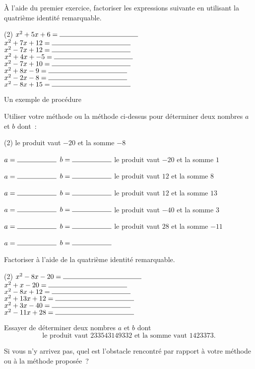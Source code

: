 \documentclass[a4paper,12pt]{report}
\begin{document}
\begin{exo}
	À l'aide du premier exercice, factoriser les expressions suivante en utilisant la quatrième identité remarquable.
\begin{tasks}(2)
\task $x^2+5x+6=\ligne{4}$ 
\task $x^2+7x+12=\ligne{4}$
\task $x^2-7x+12=\ligne{4}$
\task $x^2+4x+-5=\ligne{4}$
\task $x^2-7x+10=\ligne{4}$
\task $x^2+8x-9=\ligne{4}$
\task $x^2-2x-8=\ligne{4}$
\task $x^2-8x+15=\ligne{4}$
\end{tasks}	
\end{exo}

\afterpage{\bpage}
\newpage

Un exemple de procédure 
\begin{exo}
	Utiliser votre méthode ou la méthode ci-dessus pour déterminer deux nombres $a$ et $b$ dont~:
	\begin{tasks}(2)
\task le produit vaut $-20$ et la somme $-8$

\vspace{15pt}
$a=\ligne{2}$ $b=\ligne{2}$
\task le produit vaut $-20$ et la somme $1$

\vspace{15pt}
$a=\ligne{2}$ $b=\ligne{2}$
\task le produit vaut $12$ et la somme $8$

\vspace{15pt}
$a=\ligne{2}$ $b=\ligne{2}$
\task le produit vaut $12$ et la somme $13$

\vspace{15pt}
$a=\ligne{2}$ $b=\ligne{2}$
\task le produit vaut $-40$ et la somme $3$

\vspace{15pt}
$a=\ligne{2}$ $b=\ligne{2}$
\task le produit vaut $28$ et la somme $-11$

\vspace{15pt}
$a=\ligne{2}$ $b=\ligne{2}$
	
\end{tasks}
\end{exo}
\begin{exo}
	Factoriser à l'aide de la quatrième identité remarquable.
	\begin{tasks}(2)
\task $x^2-8x-20=\ligne{4}$
\task $x^2+x-20=\ligne{4}$
\task $x^2-8x+12=\ligne{4}$
\task $x^2+13x+12=\ligne{4}$
\task $x^2+3x-40=\ligne{4}$
\task $x^2-11x+28=\ligne{4}$	
\end{tasks}
\end{exo}
\begin{exo}
Essayer de déterminer deux nombres $a$ et $b$ dont \[\text{le produit vaut } 233543149332 \text{ et la somme vaut } 1423373.\]
\end{exo}
Si vous n'y arrivez pas, quel est l'obstacle rencontré par rapport à votre méthode ou à la méthode proposée~?
\end{document}
